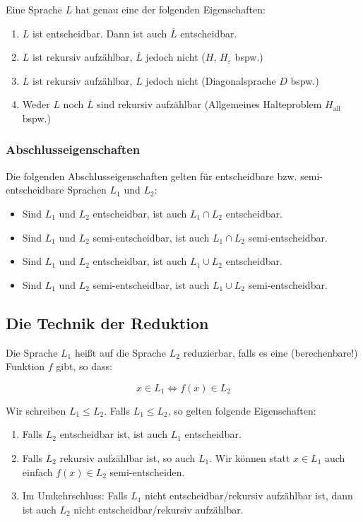 \documentclass[a4paper,parskip=half*,DIV=7,fontsize=11pt]{scrartcl}
\newcommand\comp[1]{\overline#1}
\begin{document}
Eine Sprache $L$ hat genau eine der folgenden Eigenschaften:

\begin{enumerate}
\item  $L$ ist entscheidbar. Dann ist auch $\comp{L}$ entscheidbar.
\item $L$ ist rekursiv aufzählbar, $\comp{L}$ jedoch nicht ($H$, $H_\varepsilon$ bspw.)
\item $\comp{L}$ ist rekursiv aufzählbar, $L$ jedoch nicht (Diagonalsprache $D$ bspw.)
\item Weder $L$ noch $\comp{L}$ sind rekursiv aufzählbar (Allgemeines Halteproblem $H_\text{all}$ bspw.)
\end{enumerate}

\subsubsection{Abschlusseigenschaften}
Die folgenden Abschlusseigenschaften gelten für entscheidbare bzw. semi-entscheidbare Sprachen $L_1$ und $L_2$:
\begin{itemize}
\item Sind $L_1$ und $L_2$ entscheidbar, ist auch $L_1\cap L_2$ entscheidbar.
\item Sind $L_1$ und $L_2$ semi-entscheidbar, ist auch $L_1\cap L_2$ semi-entscheidbar.
\item Sind $L_1$ und $L_2$ entscheidbar, ist auch $L_1\cup L_2$ entscheidbar.
\item Sind $L_1$ und $L_2$ semi-entscheidbar, ist auch $L_1\cup L_2$ semi-entscheidbar.
\end{itemize}

\subsection{Die Technik der Reduktion}
\label{sec:reduktion}
Die Sprache $L_1$ heißt auf die Sprache $L_2$ reduzierbar, falls  es eine (berechenbare!) Funktion $f$ gibt, so dass:

\[x \in L_1 \iff f(x) \in L_2\]

Wir schreiben $L_1 \leq L_2$. Falls $L_1 \leq L_2$, so gelten folgende Eigenschaften:

\begin{enumerate}
\item Falls $L_2$ entscheidbar ist, ist auch $L_1$ entscheidbar.
\item  Falls $L_2$ rekursiv aufzählbar ist, so auch $L_1$. Wir können statt $x \in L_1$ auch einfach $f(x) \in L_2$ semi-entscheiden.
\item Im Umkehrschluss: Falls $L_1$ nicht entscheidbar/rekursiv aufzählbar ist, dann ist auch $L_2$ nicht entscheidbar/rekursiv aufzählbar.
\end{enumerate}
\end{document}
